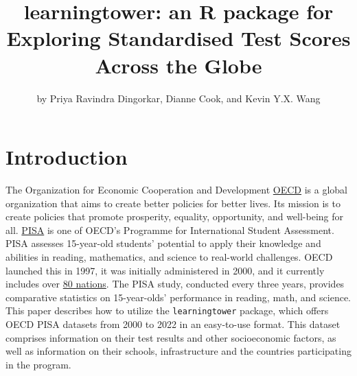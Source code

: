 \title{learningtower: an R package for Exploring Standardised Test Scores Across the Globe}


\author{by Priya Ravindra Dingorkar, Dianne Cook, and Kevin Y.X. Wang}

\maketitle


\section{Introduction}\label{introduction}

The Organization for Economic Cooperation and Development \href{https://www.oecd.org/about/}{OECD} is a global organization that aims to create better policies for better lives. Its mission is to create policies that promote prosperity, equality, opportunity, and well-being for all. \citep{oecd} \href{https://www.oecd.org/pisa/}{PISA} is one of OECD's Programme for International Student Assessment. PISA assesses 15-year-old students' potential to apply their knowledge and abilities in reading, mathematics, and science to real-world challenges. OECD launched this in 1997, it was initially administered in 2000, and it currently includes over \href{https://www.oecd.org/pisa/aboutpisa/pisa-participants.htm}{80 nations}. \citep{pisa} The PISA study, conducted every three years, provides comparative statistics on 15-year-olds' performance in reading, math, and science. This paper describes how to utilize the \texttt{learningtower} package, which offers OECD PISA datasets from 2000 to 2022 in an easy-to-use format. This dataset comprises information on their test results and other socioeconomic factors, as well as information on their schools, infrastructure and the countries participating in the program.

